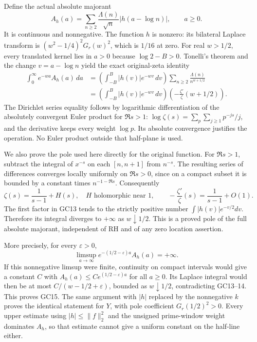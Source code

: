 Define the actual absolute majorant
\[
 A_h(a)=\sum_{n\ge2}\frac{\Lambda(n)}{\sqrt n}
                             |h(a-\log n)|,\qquad a\ge0.
 \tag{GC12}
\]
It is continuous and nonnegative. The function \(h\) is nonzero:
its bilateral Laplace transform is
\((w^2-1/4)^2G_r(w)^2\), which is \(1/16\) at zero.
For real \(w>1/2\), every translated kernel lies in \(a>0\)
because \(\log2-B>0\). Tonelli's theorem and the change
\(v=a-\log n\) yield the exact original-zeta identity
\[
\begin{split}
 \int_0^\infty e^{-wa}A_h(a)\,da
 &=\left(\int_{-B}^{B}|h(v)|e^{-wv}\,dv\right)
                      \sum_{n\ge2}\frac{\Lambda(n)}{n^{w+1/2}}\\
 &=\left(\int_{-B}^{B}|h(v)|e^{-wv}\,dv\right)
                      \left(-\frac{\zeta'}{\zeta}(w+1/2)\right).
\end{split}\tag{GC13}
\]
The Dirichlet series equality follows by logarithmic differentiation
of the absolutely convergent Euler product for \(\Re s>1\):
\(\log\zeta(s)=\sum_p\sum_{j\ge1}p^{-js}/j\), and the derivative
keeps every weight \(\log p\). Its absolute convergence justifies
the operation. No Euler product outside that half-plane is used.

We also prove the pole used here directly for the original function.
For \(\Re s>1\), subtract the integral of \(x^{-s}\) on each
\([n,n+1]\) from \(n^{-s}\). The resulting series of differences
converges locally uniformly on \(\Re s>0\), since on a compact
subset it is bounded by a constant times \(n^{-1-\Re s}\).
Consequently
\[
 \zeta(s)=\frac1{s-1}+H(s),\quad H\text{ holomorphic near }1,
 \qquad -\frac{\zeta'}{\zeta}(s)=\frac1{s-1}+O(1).
 \tag{GC14}
\]
The first factor in GC13 tends to the strictly positive number
\(\int|h(v)|e^{-v/2}dv\). Therefore its integral diverges to
\(+\infty\) as \(w\downarrow1/2\). This is a proved pole of
the full absolute majorant, independent of RH and of any zero
location assertion.

More precisely, for every \(\varepsilon>0\),
\[
 \boxed{\limsup_{a\to\infty}
       e^{-(1/2-\varepsilon)a}A_h(a)=+\infty.}\tag{GC15}
\]
If this nonnegative limsup were finite, continuity on compact
intervals would give a constant \(C\) with
\(A_h(a)\le Ce^{(1/2-\varepsilon)a}\) for all \(a\ge0\).
Its Laplace integral would then be at most
\(C/(w-1/2+\varepsilon)\), bounded as \(w\downarrow1/2\),
contradicting GC13--14. This proves GC15. The same argument with
\(|h|\) replaced by the nonnegative \(k\) proves the identical
statement for \(Y\), with pole coefficient \(G_r(1/2)^2>0\).
Every upper estimate using \(|h|\le\|f\|_2^2\) and the unsigned
prime-window weight dominates \(A_h\), so that estimate cannot
give a uniform constant on the half-line either.

